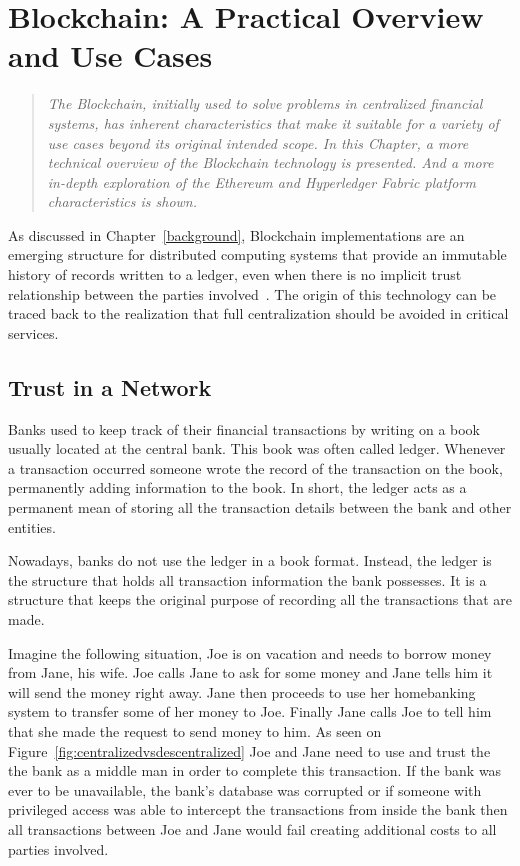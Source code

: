 \chapter{Blockchain: A Practical Overview and Use Cases}\label{blockchain}

\begin{quote} 
  \emph{The Blockchain, initially used to solve problems in centralized
  financial systems, has inherent characteristics that make it suitable for a
  variety of use cases beyond its original intended scope. In this Chapter, a
  more technical overview of the Blockchain technology is presented. And a more
  in-depth exploration of the Ethereum and Hyperledger Fabric platform
  characteristics is shown.}
\end{quote}

As discussed in Chapter~\ref{background}, Blockchain implementations are an
emerging structure for distributed computing systems that provide an immutable
history of records written to a ledger, even when there is no implicit trust
relationship between the parties involved~\cite{Barclay2017}. The origin of
this technology can be traced back to the realization that full centralization
should be avoided in critical services.

\section{Trust in a Network}

Banks used to keep track of their financial transactions by writing on a book
usually located at the central bank. This book was often called ledger.
Whenever a transaction occurred someone wrote the record of the transaction on
the book, permanently adding information to the book. In short, the ledger acts
as a permanent mean of storing all the transaction details between the bank and
other entities. 

Nowadays, banks do not use the ledger in a book format. Instead, the ledger is
the structure that holds all transaction information the bank possesses. It is
a structure that keeps the original purpose of recording all the transactions
that are made.

Imagine the following situation, Joe is on vacation and needs to borrow money
from Jane, his wife. Joe calls Jane to ask for some money and Jane tells him it
will send the money right away. Jane then proceeds to use her homebanking
system to transfer some of her money to Joe. Finally Jane calls Joe to tell him
that she made the request to send money to him.  As seen on
Figure~\ref{fig:centralizedvsdescentralized} Joe and Jane need to use and trust
the the bank as a middle man in order to complete this transaction. If the bank
was ever to be unavailable, the bank's database was corrupted or if someone
with  privileged access was able to intercept the transactions from inside the
bank then all transactions between Joe and Jane would fail creating additional
costs to all parties involved. 

